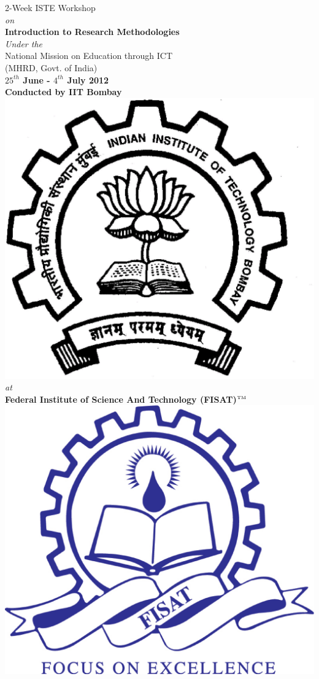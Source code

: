 \documentclass[notuble,10pt,a4paper]{leaflet}
\begin{document}
\begin{center}
{\large 2-Week ISTE Workshop} \\[.3cm]
\textit{on}\\[.4cm]
{\large \textbf{Introduction to Research Methodologies}}\\ [.3cm]
\textit{{\small Under the}}\\[.3cm]
{\normalsize National Mission on Education through ICT\\
(MHRD, Govt. of India)}\\[.4cm]
\textbf{{\large $25^{th}$ June - $4^{th}$ July 2012}}\\[.5cm]
{\large \textbf{Conducted by IIT Bombay}}\\[.5cm]
\includegraphics[scale=.15]{iitb}\\[.5cm]
\textit{{\small at}}\\[.3cm]
{\large\textbf{ Federal Institute of Science And Technology (FISAT)$^{\tiny{\mbox{TM}}}$}} \\[.4cm]
\includegraphics[scale=.13]{logod}\\

\end{center}
\end{document}
